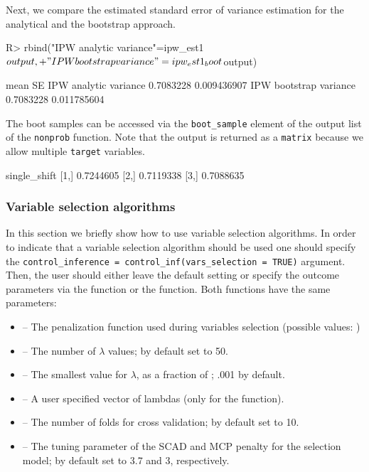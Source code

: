 \documentclass[
]{jss}
\begin{document}
Next, we compare the estimated standard error of variance estimation for
the analytical and the bootstrap approach.

\begin{CodeChunk}
\begin{CodeInput}
R> rbind("IPW analytic variance"=ipw_est1$output,
+       "IPW bootstrap variance"=ipw_est1_boot$output)
\end{CodeInput}
\begin{CodeOutput}
                            mean          SE
IPW analytic variance  0.7083228 0.009436907
IPW bootstrap variance 0.7083228 0.011785604
\end{CodeOutput}
\end{CodeChunk}

The boot samples can be accessed via the \texttt{boot\_sample} element
of the output list of the \texttt{nonprob} function. Note that the
output is returned as a \texttt{matrix} because we allow multiple
\texttt{target} variables.

\begin{CodeChunk}
\begin{CodeOutput}
     single_shift
[1,]    0.7244605
[2,]    0.7119338
[3,]    0.7088635
\end{CodeOutput}
\end{CodeChunk}

\subsubsection{Variable selection
algorithms}\label{variable-selection-algorithms}

In this section we briefly show how to use variable selection
algorithms. In order to indicate that a variable selection algorithm
should be used one should specify the
\texttt{control\_inference\ =\ control\_inf(vars\_selection\ =\ TRUE)}
argument. Then, the user should either leave the default setting or
specify the outcome parameters via the  function or
the  function. Both functions have the same
parameters:

\begin{itemize}
\item {} -- The penalization function used during variables selection (possible values: )
\item {} -- The number of $\lambda$ values; by default set to 50.
\item {} -- The smallest value for $\lambda$, as a fraction of ; .001 by default.
\item {} -- A user specified vector of lambdas (only for the  function).
\item {} -- The number of folds for cross validation; by default set to 10.
\item {} -- The tuning parameter of the SCAD and MCP penalty for the selection model; by default set to 3.7 and 3, respectively.
\end{itemize}
\end{document}
